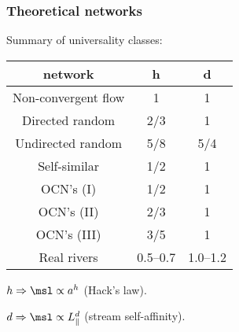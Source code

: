 \begin{frame}[label=]
  \frametitle{Theoretical networks}

  \begin{block}{Summary of universality classes:}
    \begin{center}
      \settablerowcolours
      \begin{tabular}{ccc}
        \hline\hline
        \textbf{network} & h & d \\
        \hline
        Non-convergent flow      & 1     & 1 \\
        Directed random          & 2/3   & 1 \\
        Undirected random        & 5/8 & 5/4 \\
        Self-similar             & 1/2 & 1 \\
        OCN's (I)                & 1/2 & 1 \\
        OCN's (II)               & 2/3 & 1 \\
        OCN's (III)              & 3/5 & 1 \\
        Real rivers              & 0.5--0.7 & 1.0--1.2 \\
        \hline\hline
      \end{tabular}

      $ h \Rightarrow \msl \propto a^h$ (Hack's law).

      $ d \Rightarrow \msl \propto L_\parallel^d$ (stream self-affinity).

    \end{center}
  \end{block}

\end{frame}






